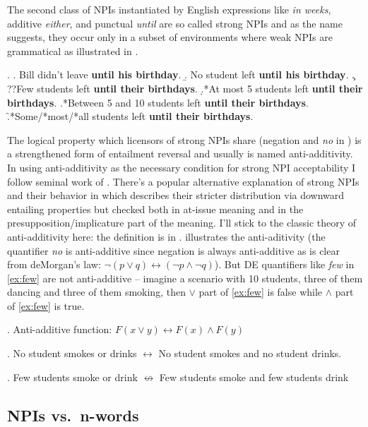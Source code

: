 \documentclass[12pt]{scrartcl}
\begin{document}
The second class of NPIs instantiated by English expressions like  \emph{in weeks}, additive \emph{either}, and punctual \emph{until} are so called strong NPIs and as the name suggests, they occur only in a subset of environments where weak NPIs are grammatical as illustrated in \Next.


\ex. \a. Bill didn't leave \textbf{until his birthday}. \b. No student
left \textbf{until his birthday}. \c. ??Few students left \textbf{until
their birthdays}. \d.*At most 5 students left \textbf{until their
birthdays}. \e.*Between 5 and 10 students left \textbf{until their
birthdays}. \f.*Some/*most/*all students left \textbf{until their
birthdays}.

The logical property which licensors of strong NPIs share (negation and \textit{no} in \Last) is a strengthened form of entailment reversal and usually is named anti-additivity. In using anti-additivity as the necessary condition for strong NPI acceptability I follow seminal work of \cite{zwarts1998three}. There's a popular alternative explanation of strong NPIs and their behavior in \cite{gajewski2011licensing} which describes their stricter distribution via downward entailing properties but checked both in at-issue meaning and in the presupposition/implicature part of the meaning. I'll stick to the classic theory of anti-additivity here: the definition is in \Next. \NNext illustrates the anti-aditivity (the quantifier \textit{no} is anti-additive since negation is always anti-additive as is clear from deMorgan's law: $\neg(p \vee q) \leftrightarrow (\neg p \wedge \neg q)$). But DE quantifiers like \textit{few} in \ref{ex:few} are not anti-additive -- imagine a scenario with 10 students, three of them dancing and three of them smoking, then $\vee$ part of \ref{ex:few} is false while $\wedge$ part of \ref{ex:few} is true.



\ex. Anti-additive function:
\(F(x \vee y) \leftrightarrow F(x) \wedge F(y)\)

\ex. No student smokes or drinks \(\leftrightarrow\) No student smokes
and no student drinks.

\ex. Few students smoke or drink \(\not\leftrightarrow\) Few students
smoke and few students drink \label{ex:few}



\hypertarget{npis-vs.n-words-modularity}{%
\subsection{NPIs vs.~n-words}\label{npis-vs.n-words-modularity}}
\end{document}
